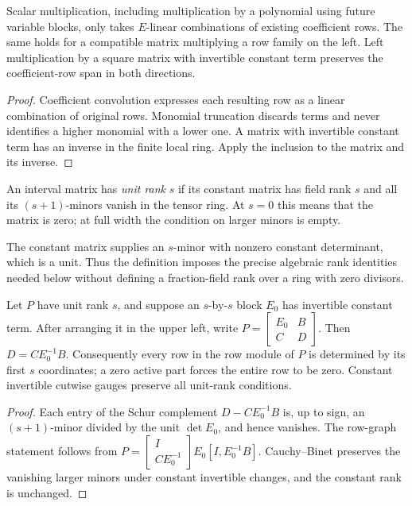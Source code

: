\begin{lemma}\label{lem:coeff}
Scalar multiplication, including multiplication by a polynomial using
future variable blocks, only takes $E$-linear combinations of existing
coefficient rows. The same holds for a compatible matrix multiplying
a row family on the left. Left multiplication by a square matrix with
invertible constant term preserves the coefficient-row span in both
directions.
\end{lemma}
\begin{proof}
Coefficient convolution expresses each resulting row as a linear
combination of original rows. Monomial truncation discards terms and
never identifies a higher monomial with a lower one. A matrix with
invertible constant term has an inverse in the finite local ring.
Apply the inclusion to the matrix and its inverse.
\end{proof}

\begin{definition}\label{def:unitrank}
An interval matrix has \emph{unit rank} $s$ if its constant matrix
has field rank $s$ and all its $(s+1)$-minors vanish in the tensor
ring. At $s=0$ this means that the matrix is zero; at full width the
condition on larger minors is empty.
\end{definition}

The constant matrix supplies an $s$-minor with nonzero constant
determinant, which is a unit. Thus the definition imposes the precise
algebraic rank identities needed below without defining a fraction-field
rank over a ring with zero divisors.

\begin{lemma}\label{lem:graph}
Let $P$ have unit rank $s$, and suppose an $s$-by-$s$ block $E_0$
has invertible constant term. After arranging it in the upper left,
write $P=\left[\begin{smallmatrix}E_0&B\\C&D\end{smallmatrix}\right]$.
Then $D=CE_0^{-1}B$. Consequently every row in the row module of $P$
is determined by its first $s$ coordinates; a zero active part forces
the entire row to be zero. Constant invertible cutwise gauges preserve
all unit-rank conditions.
\end{lemma}
\begin{proof}
Each entry of the Schur complement $D-CE_0^{-1}B$ is, up to sign,
an $(s+1)$-minor divided by the unit $\det E_0$, and hence vanishes.
The row-graph statement follows from
$P=\left[\begin{smallmatrix}I\\CE_0^{-1}\end{smallmatrix}\right]
E_0[I,E_0^{-1}B]$.
Cauchy--Binet preserves the vanishing larger minors under constant
invertible changes, and the constant rank is unchanged.
\end{proof}

